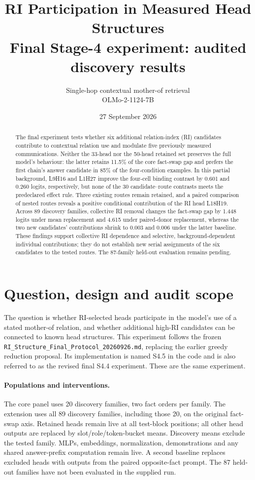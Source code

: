 \documentclass[11pt,a4paper]{article}
\title{RI Participation in Measured Head Structures\\
\large Final Stage-4 experiment: audited discovery results}
\author{Single-hop contextual mother-of retrieval\\OLMo-2-1124-7B}
\date{27 September 2026}
\newcommand{\file}[1]{\nolinkurl{#1}}
\begin{document}
\maketitle

\begin{abstract}
The final experiment tests whether six additional relation-index (RI) candidates
contribute to contextual relation use and modulate five previously measured
communications. Neither the 33-head nor the 50-head retained set preserves the
full model's behaviour: the latter retains 11.5\% of the core fact-swap gap and
prefers the first chain's answer candidate in 85\% of the four-condition examples.
In this partial background, L9H16 and L1H27 improve the four-cell binding contrast
by 0.601 and 0.260 logits, respectively, but none of the 30 candidate--route
contrasts meets the predeclared effect rule. Three existing routes remain
retained, and a paired comparison of nested routes reveals a positive conditional
contribution of the RI head L18H19. Across 89 discovery families, collective RI
removal changes the fact-swap gap by 1.448 logits under mean replacement and 4.615
under paired-donor replacement, whereas the two new candidates' contributions
shrink to 0.003 and 0.006 under the latter baseline. These findings support
collective RI dependence and selective, background-dependent individual
contributions; they do not establish new serial assignments of the six candidates
to the tested routes. The 87-family held-out evaluation remains pending.
\end{abstract}

\section{Question, design and audit scope}
The question is whether RI-selected heads participate in the model's use of a
stated mother-of relation, and whether additional high-RI candidates can be
connected to known head structures. This experiment follows the frozen
\file{RI_Structure_Final_Protocol_20260926.md}, replacing the earlier greedy
reduction proposal. Its implementation is named S4.5 in the code and is also
referred to as the revised final S4.4 experiment. These are the same experiment.

\paragraph{Populations and interventions.}
The core panel uses 20 discovery families, two fact orders per family. The
extension uses all 89 discovery families, including those 20, on the original
fact-swap axis. Retained heads remain live at all test-block positions; all other
head outputs are replaced by slot/role/token-bucket means. Discovery means exclude
the tested family. MLPs, embeddings, normalization, demonstrations and any shared
answer-prefix computation remain live. A second baseline replaces excluded heads
with outputs from the paired opposite-fact prompt. The 87 held-out families have
not been evaluated in the supplied run.
\end{document}
